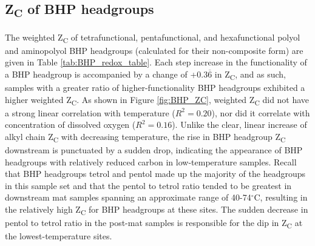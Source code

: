\subsection{Z\textsubscript{C} of BHP headgroups}

The weighted Z\textsubscript{C} of tetrafunctional, pentafunctional, and hexafunctional polyol and aminopolyol BHP headgroups (calculated for their non-composite form) are given in Table \ref{tab:BHP_redox_table}. Each step increase in the functionality of a BHP headgroup is accompanied by a change of +$0.3\overline{6}$ in Z\textsubscript{C}, and as such, samples with a greater ratio of higher-functionality BHP headgroups exhibited a higher weighted Z\textsubscript{C}. As shown in Figure \ref{fig:BHP_ZC}, weighted Z\textsubscript{C} did not have a strong linear correlation with temperature ($R^{2} = 0.20$), nor did it correlate with concentration of dissolved oxygen ($R^{2} = 0.16$). Unlike the clear, linear increase of alkyl chain Z\textsubscript{C} with decreasing temperature, the rise in BHP headgroup Z\textsubscript{C} downstream is punctuated by a sudden drop, indicating the appearance of BHP headgroups with relatively reduced carbon in low-temperature samples. Recall that BHP headgroups tetrol and pentol made up the majority of the headgroups in this sample set and that the pentol to tetrol ratio tended to be greatest in downstream mat samples spanning an approximate range of 40-74$^{\circ}$C, resulting in the relatively high Z\textsubscript{C} for BHP headgroups at these sites. The sudden decrease in pentol to tetrol ratio in the post-mat samples is responsible for the dip in Z\textsubscript{C} at the lowest-temperature sites.

